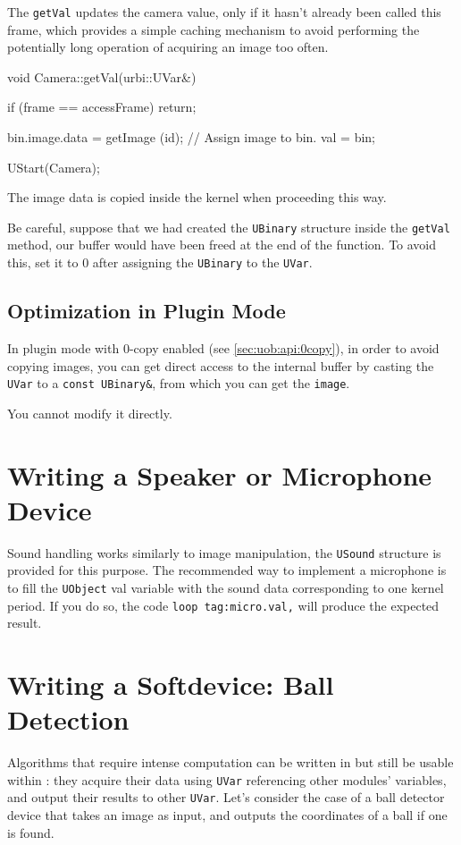 The \lstinline{getVal} updates the camera value, only if it hasn't
already been called this frame, which provides a simple caching
mechanism to avoid performing the potentially long operation of
acquiring an image too often.

\begin{cxx}
void
Camera::getVal(urbi::UVar&)
{
  if (frame == accessFrame)
    return;

  bin.image.data = getImage (id);
  // Assign image to bin.
  val = bin;
}

UStart(Camera);
\end{cxx}

The image data is copied inside the kernel when proceeding this way.

Be careful, suppose that we had created the \lstinline{UBinary}
structure inside the \lstinline{getVal} method, our buffer would have
been freed at the end of the function. To avoid this, set it to 0
after assigning the \lstinline{UBinary} to the \lstinline{UVar}.

\subsection{Optimization in Plugin Mode}

In plugin mode with 0-copy enabled (see \autoref{sec:uob:api:0copy}), in
order to avoid copying images, you can get direct access to the internal
buffer by casting the \lstinline{UVar} to a \lstinline{const UBinary&}, from
which you can get the \lstinline{image}.

You cannot modify it directly.

\section{Writing a Speaker or Microphone Device}

Sound handling works similarly to image manipulation, the
\lstinline{USound} structure is provided for this purpose. The
recommended way to implement a microphone is to fill the
\lstinline{UObject} val variable with the sound data corresponding to
one kernel period. If you do so, the \urbi code
\lstinline{loop tag:micro.val,} will produce the expected result.

\section{Writing a Softdevice: Ball Detection}

Algorithms that require intense computation can be written in \Cxx but
still be usable within \urbi: they acquire their data using
\lstinline{UVar} referencing other modules' variables, and output
their results to other \lstinline{UVar}. Let's consider the case of a
ball detector device that takes an image as input, and outputs the
coordinates of a ball if one is found.

